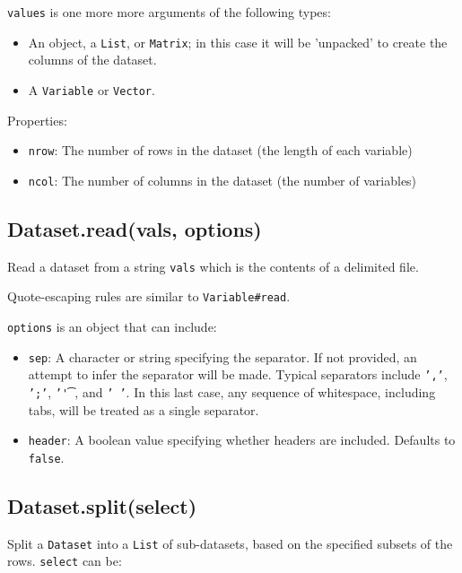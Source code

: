 \documentclass{article}
\begin{document}
\texttt{values} is one more more arguments of the following types:


\begin{itemize}

\item An object, a \texttt{List}, or \texttt{Matrix}; in this case it will be 'unpacked' to create
the columns of the dataset.

\item A \texttt{Variable} or \texttt{Vector}.

\end{itemize}

Properties:


\begin{itemize}

\item \texttt{nrow}: The number of rows in the dataset (the length of each variable)

\item \texttt{ncol}: The number of columns in the dataset (the number of variables)

\end{itemize}

    \subsection{Dataset.read(vals, options)}
    Read a dataset from a string \texttt{vals} which is the contents of a delimited file.


Quote-escaping rules are similar to \texttt{Variable\#read}.


\texttt{options} is an object that can include:


\begin{itemize}

\item \texttt{sep}: A character or string specifying the separator. If not provided, an attempt
to infer the separator will be made. Typical separators include \texttt{','}, \texttt{';'}, \texttt{'\t'},
and \texttt{' '}. In this last case, any sequence of whitespace, including tabs, will be
treated as a single separator.

\item \texttt{header}: A boolean value specifying whether headers are included. Defaults to \texttt{false}.

\end{itemize}

    \subsection{Dataset.split(select)}
    Split a \texttt{Dataset} into a \texttt{List} of sub-datasets, based on the specified
subsets of the rows.  \texttt{select} can be:
\end{document}
